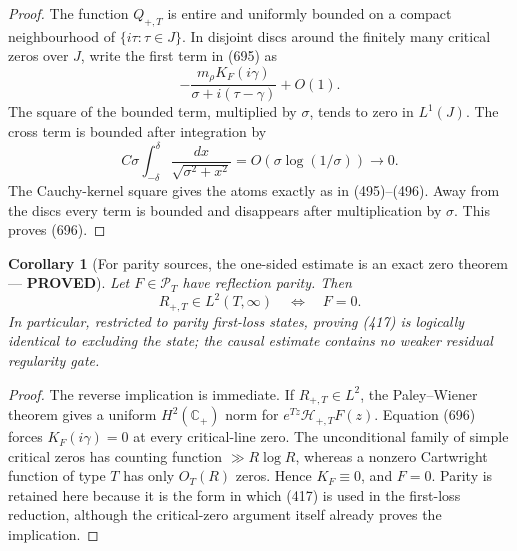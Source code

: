 \documentclass[11pt]{article}
\newtheorem{corollary}[theorem]{Corollary}
\newcommand{\PROVED}{\textcolor{green!45!black}{\textbf{PROVED}}}
\begin{document}
\begin{proof}
The function \(Q_{+,T}\) is entire and uniformly bounded on a compact
neighbourhood of \(\{i\tau:\tau\in J\}\).  In disjoint discs around the
finitely many critical zeros over \(J\), write the first term in (695) as
\[
 -\frac{m_\rho K_F(i\gamma)}
        {\sigma+i(\tau-\gamma)}+O(1).
\]
The square of the bounded term, multiplied by \(\sigma\), tends to zero in
\(L^1(J)\).  The cross term is bounded after integration by
\[
 C\sigma\int_{-\delta}^{\delta}
 \frac{dx}{\sqrt{\sigma^2+x^2}}
 =O(\sigma\log(1/\sigma))\longrightarrow0.
\]
The Cauchy-kernel square gives the atoms exactly as in (495)--(496).
Away from the discs every term is bounded and disappears after
multiplication by \(\sigma\).  This proves (696).
\end{proof}

\begin{corollary}[For parity sources, the one-sided estimate is an exact
zero theorem --- \PROVED]
Let \(F\in\mathcal P_T\) have reflection parity.  Then
\begin{equation}
 R_{+,T}\in L^2(T,\infty)\quad\Longleftrightarrow\quad F=0.       \tag{697}
\end{equation}
In particular, restricted to parity first-loss states, proving (417) is
logically identical to excluding the state; the causal estimate contains
no weaker residual regularity gate.
\end{corollary}

\begin{proof}
The reverse implication is immediate.  If \(R_{+,T}\in L^2\), the
Paley--Wiener theorem gives a uniform \(H^2(\mathbb C_+)\) norm for
\(e^{Tz}\mathcal H_{+,T}F(z)\).  Equation (696) forces
\(K_F(i\gamma)=0\) at every critical-line zero.  The unconditional family
of simple critical zeros has counting function \(\gg R\log R\), whereas a
nonzero Cartwright function of type \(T\) has only \(O_T(R)\) zeros.
Hence \(K_F\equiv0\), and \(F=0\).  Parity is retained here because it is
the form in which (417) is used in the first-loss reduction, although the
critical-zero argument itself already proves the implication.
\end{proof}
\end{document}
